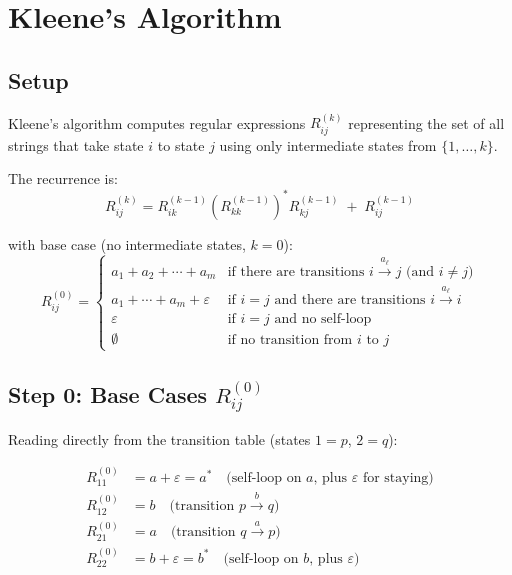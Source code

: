 \documentclass{article}
\theoremstyle{theorem}
\theoremstyle{definition}
\theoremstyle{remark}
\begin{document}
\begin{center}
\end{center}

\section*{Kleene's Algorithm}

\subsection*{Setup}

Kleene's algorithm computes regular expressions $R^{(k)}_{ij}$ representing the set of all strings that take state $i$ to state $j$ using only intermediate states from $\{1, \ldots, k\}$.

\medskip
The recurrence is:
\[
R^{(k)}_{ij} = R^{(k-1)}_{ik}\left(R^{(k-1)}_{kk}\right)^* R^{(k-1)}_{kj} \;+\; R^{(k-1)}_{ij}
\]

with base case (no intermediate states, $k=0$):
\[
R^{(0)}_{ij} =
\begin{cases}
a_1 + a_2 + \cdots + a_m & \text{if there are transitions } i \xrightarrow{a_\ell} j \text{ (and } i \neq j\text{)} \\
a_1 + \cdots + a_m + \varepsilon & \text{if } i = j \text{ and there are transitions } i \xrightarrow{a_\ell} i \\
\varepsilon & \text{if } i = j \text{ and no self-loop} \\
\emptyset & \text{if no transition from } i \text{ to } j
\end{cases}
\]

\subsection*{Step 0: Base Cases $R^{(0)}_{ij}$}

Reading directly from the transition table (states $1 = p$, $2 = q$):

\begin{align*}
R^{(0)}_{11} &= a + \varepsilon = a^* \quad \text{(self-loop on } a \text{, plus } \varepsilon \text{ for staying)} \\[4pt]
R^{(0)}_{12} &= b \quad \text{(transition } p \xrightarrow{b} q \text{)} \\[4pt]
R^{(0)}_{21} &= a \quad \text{(transition } q \xrightarrow{a} p \text{)} \\[4pt]
R^{(0)}_{22} &= b + \varepsilon = b^* \quad \text{(self-loop on } b \text{, plus } \varepsilon\text{)}
\end{align*}
\end{document}
